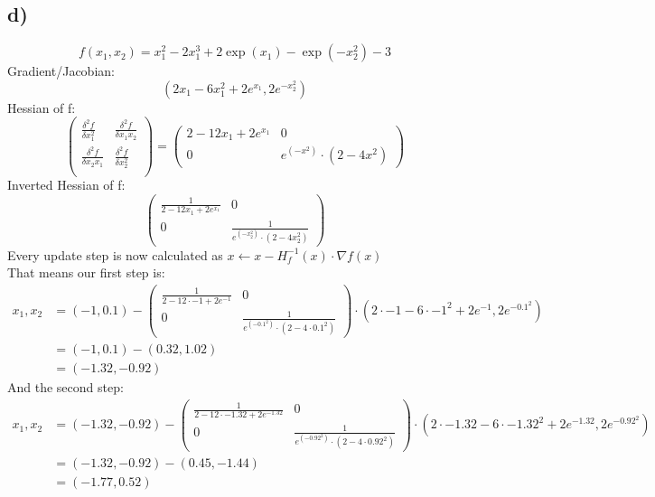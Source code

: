 \documentclass[12pt,a4paper]{scrartcl}
\begin{document}
	\subsection*{d)}
	$$f(x_1,x_2) = x_1^2 - 2x_1^3 + 2 \exp(x_1) - \exp(-x_2^2) - 3$$
	Gradient/Jacobian: $$(2x_1 - 6x_1^2 + 2e^{x_1}, 2e^{-x_2^2})$$
	Hessian of f:\\
	$$\begin{pmatrix}
		\frac{\delta^2 f}{\delta x_1^2} & \frac{\delta^2 f}{\delta x_1x_2} \\
		\frac{\delta^2 f}{\delta x_2x_1} & \frac{\delta^2 f}{\delta x_2^2} \\
	\end{pmatrix} 
	= \begin{pmatrix}
		2 - 12x_1 + 2e^{x_1} & 0 \\
		0 & e^{(-x^2)} \cdot (2 - 4 x^2)
	\end{pmatrix}
	$$
	Inverted Hessian of f: \\
	$$\begin{pmatrix}
		\frac{1}{2 - 12x_1 + 2e^{x_1}} & 0 \\
		0 & \frac{1}{e^{(-x_2^2)} \cdot (2 - 4 x_2^2)}
	\end{pmatrix}$$
	Every update step is now calculated as $x \leftarrow x - H_f^{-1} (x) \cdot \nabla f(x)$\\
	That means our first step is: \\
	\begin{align*}
		x_1, x_2 &= (-1,0.1) - \begin{pmatrix}
		\frac{1}{2 - 12\cdot -1 + 2e^{-1}} & 0 \\
		0 & \frac{1}{e^{(-0.1^2)} \cdot (2 - 4 \cdot 0.1^2)} 
		\end{pmatrix} 
		\cdot (2 \cdot -1 - 6 \cdot -1^2 + 2e^{-1}, 2e^{-0.1^2}) \\
		&= (-1,0.1) - (0.32, 1.02) \\
		&= (-1.32, -0.92)
	\end{align*}
	And the second step: \\
	\begin{align*}
		x_1, x_2 &= (-1.32, -0.92) - \begin{pmatrix}
			\frac{1}{2 - 12\cdot -1.32 + 2e^{-1.32}} & 0 \\
			0 & \frac{1}{e^{(-0.92^2)} \cdot (2 - 4 \cdot 0.92^2)}
		\end{pmatrix} \cdot 
		(2 \cdot -1.32 - 6 \cdot -1.32^2 + 2e^{-1.32}, 2e^{-0.92^2}) \\
		&= (-1.32,-0.92) - (0.45, -1.44)\\
		&= (-1.77, 0.52)
	\end{align*}
\end{document}
